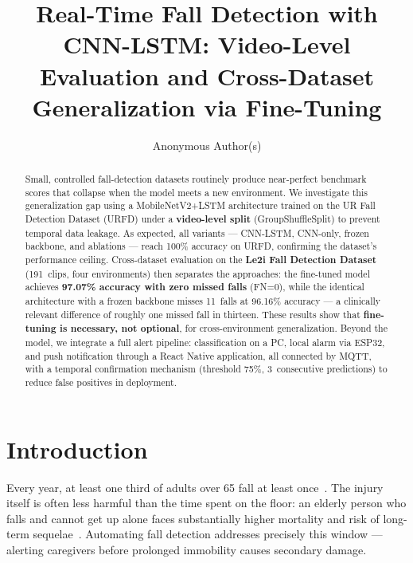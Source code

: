 \documentclass[runningheads]{llncs}
\begin{document}
%
\title{Real-Time Fall Detection with CNN-LSTM: Video-Level\\Evaluation and Cross-Dataset Generalization via Fine-Tuning}
%
%
\author{Anonymous Author(s)}
%
%
%
\maketitle
%
\begin{abstract}
Small, controlled fall-detection datasets routinely produce near-perfect benchmark scores that collapse when the model meets a new environment. We investigate this generalization gap using a MobileNetV2+LSTM architecture trained on the UR Fall Detection Dataset (URFD) under a \textbf{video-level split} (GroupShuffleSplit) to prevent temporal data leakage. As expected, all variants --- CNN-LSTM, CNN-only, frozen backbone, and ablations --- reach 100\% accuracy on URFD, confirming the dataset's performance ceiling. Cross-dataset evaluation on the \textbf{Le2i Fall Detection Dataset} (191~clips, four environments) then separates the approaches: the fine-tuned model achieves \textbf{97.07\% accuracy with zero missed falls} (FN=0), while the identical architecture with a frozen backbone misses 11~falls at 96.16\% accuracy --- a clinically relevant difference of roughly one missed fall in thirteen. These results show that \textbf{fine-tuning is necessary, not optional}, for cross-environment generalization. Beyond the model, we integrate a full alert pipeline: classification on a PC, local alarm via ESP32, and push notification through a React Native application, all connected by MQTT, with a temporal confirmation mechanism (threshold 75\%, 3~consecutive predictions) to reduce false positives in deployment.

\end{abstract}
%
%
%
\section{Introduction}

Every year, at least one third of adults over 65 fall at least once~\cite{lord2001,heinrich2010}. The injury itself is often less harmful than the time spent on the floor: an elderly person who falls and cannot get up alone faces substantially higher mortality and risk of long-term sequelae~\cite{kwolek2014}. Automating fall detection addresses precisely this window --- alerting caregivers before prolonged immobility causes secondary damage.
\end{document}
